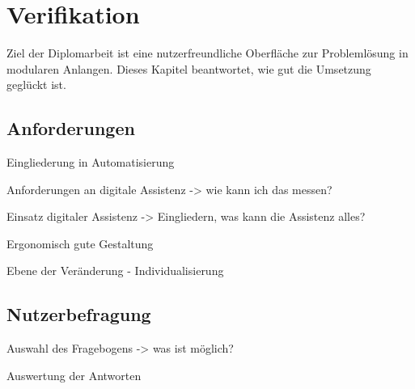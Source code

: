 \chapter{Verifikation}
\label{Verifikation}

Ziel der Diplomarbeit ist eine nutzerfreundliche Oberfläche zur Problemlösung in modularen Anlangen. Dieses Kapitel beantwortet, wie gut die Umsetzung geglückt ist.

\section{Anforderungen}
Eingliederung in Automatisierung

Anforderungen an digitale Assistenz -> wie kann ich das messen?

Einsatz digitaler Assistenz -> Eingliedern, was kann die Assistenz alles?

Ergonomisch gute Gestaltung

Ebene der Veränderung - Individualisierung


\section{Nutzerbefragung}
Auswahl des Fragebogens -> was ist möglich?

Auswertung der Antworten